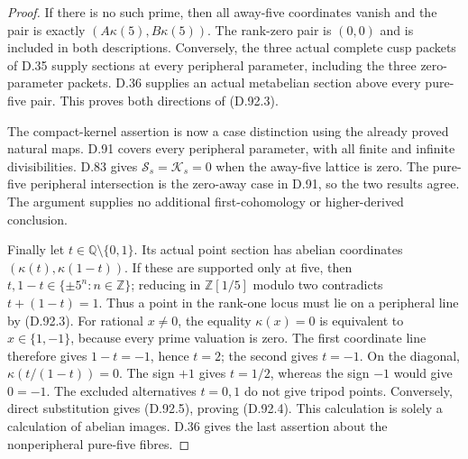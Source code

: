\begin{proof}
If there is no such prime, then all away-five coordinates
vanish and the pair is exactly
\((A\kappa(5),B\kappa(5))\). The rank-zero pair is
\((0,0)\) and is included in both descriptions.
Conversely, the three actual complete cusp packets of
D.35 supply sections at every peripheral parameter,
including the three zero-parameter packets. D.36 supplies
an actual metabelian section above every pure-five pair.
This proves both directions of (D.92.3).

The compact-kernel assertion is now a case distinction
using the already proved natural maps. D.91 covers every
peripheral parameter, with all finite and infinite
divisibilities. D.83 gives \(\mathcal S_s=\mathcal K_s=0\)
when the away-five lattice is zero. The pure-five
peripheral intersection is the zero-away case in D.91,
so the two results agree. The argument supplies no
additional first-cohomology or higher-derived conclusion.

Finally let \(t\in\mathbb Q\setminus\{0,1\}\).
Its actual point section has abelian coordinates
\((\kappa(t),\kappa(1-t))\). If these are supported
only at five, then
\(t,1-t\in\{\pm5^n:n\in\mathbb Z\}\); reducing
in \(\mathbb Z[1/5]\) modulo two contradicts
\(t+(1-t)=1\). Thus a point in the rank-one locus
must lie on a peripheral line by (D.92.3).
For rational \(x\ne0\), the equality \(\kappa(x)=0\)
is equivalent to \(x\in\{1,-1\}\), because every
prime valuation is zero. The first coordinate line
therefore gives \(1-t=-1\), hence \(t=2\); the
second gives \(t=-1\). On the diagonal,
\(\kappa(t/(1-t))=0\). The sign \(+1\) gives
\(t=1/2\), whereas the sign \(-1\) would give
\(0=-1\). The excluded alternatives \(t=0,1\)
do not give tripod points. Conversely, direct substitution
gives (D.92.5), proving (D.92.4). This calculation is
solely a calculation of abelian images. D.36 gives the
last assertion about the nonperipheral pure-five fibres.
\end{proof}
